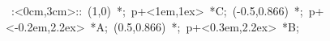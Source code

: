 

\hbox{
\xy    <3cm,0cm>:<0cm,3cm>::
       (1,0) *{\bullet}; p+<1em,1ex> *{C};
       (-0.5,0.866) *{\bullet}; p+<-0.2em,2.2ex> *{A};
       (0.5,0.866) *{\bullet}; p+<0.3em,2.2ex> *{B};
\endxy}

